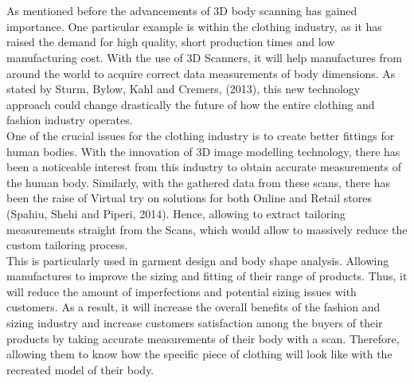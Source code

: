 \documentclass[a4paper]{article}
\begin{document}
 \section*{}
 As mentioned before the advancements of 3D body scanning has gained importance. One particular example is within the clothing industry, as it has raised the demand for high quality, short production times and low manufacturing cost. 
 With the use of 3D Scanners, it will help manufactures from around the world to acquire correct data measurements of body dimensions. 
 As stated by Sturm, Bylow, Kahl and Cremers, (2013), this new technology approach could change drastically the future of how the entire clothing and fashion industry operates.\\[10pt]
 One of the crucial issues for the clothing industry is to create better fittings for human bodies.
 With the innovation of 3D image modelling technology, there has been a noticeable interest from this industry to obtain accurate measurements of the human body.
 Similarly, with the gathered data from these scans, there has been the raise of Virtual try on solutions for both Online and Retail stores (Spahiu, Shehi and Piperi, 2014). 
 Hence, allowing to extract tailoring measurements straight from the Scans, which would allow to massively reduce the custom tailoring process. \\[10pt]
 This is particularly used in garment design and body shape analysis. Allowing manufactures to improve the sizing and fitting of their range of products. 
 Thus, it will reduce the amount of imperfections and potential sizing issues with customers. 
 As a result, it will increase the overall benefits of the fashion and sizing industry and increase customers satisfaction among the buyers of their products by taking accurate measurements of their body with a scan. 
 Therefore, allowing them to know how the specific piece of clothing will look like with the recreated model of their body. 
 \enlargethispage{\baselineskip}
\end{document}
